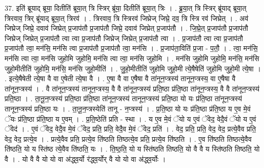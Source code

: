 \documentclass[17pt]{extarticle}
\begin{document}
37. इति॑ ब्रूयाद् ब्रूया॒ दितीति॑ ब्रूया॒त् त्रि स्त्रिर् ब्रू॑या॒ दितीति॑ ब्रूया॒त् त्रिः । . ब्रू॒या॒त् त्रि स्त्रिर् ब्रू॑याद् ब्रूया॒त् त्रिरवाव॒ त्रिर् ब्रू॑याद् ब्रूया॒त् त्रिरव॑ । . त्रिरवाव॒ त्रि स्त्रिरव॑ जिघ्रेज् जिघ्रे॒ दव॒ त्रि स्त्रि रव॑ जिघ्रेत् । . अव॑ जिघ्रेज् जिघ्रे॒ दवाव॑ जिघ्रेत् प्र॒जाप॑तौ प्र॒जाप॑तौ जिघ्रे॒ दवाव॑ जिघ्रेत् प्र॒जाप॑तौ । . जि॒घ्रे॒त् प्र॒जाप॑तौ प्र॒जाप॑तौ जिघ्रेज् जिघ्रेत् प्र॒जाप॑तौ त्वा त्वा प्र॒जाप॑तौ जिघ्रेज् जिघ्रेत् प्र॒जाप॑तौ त्वा । . प्र॒जाप॑तौ त्वा त्वा प्र॒जाप॑तौ प्र॒जाप॑तौ त्वा॒ मन॑सि॒ मन॑सि त्वा प्र॒जाप॑तौ प्र॒जाप॑तौ त्वा॒ मन॑सि । . प्र॒जाप॑ता॒विति॑ प्र॒जा - प॒तौ॒ । . त्वा॒ मन॑सि॒ मन॑सि त्वा त्वा॒ मन॑सि जुहोमि जुहोमि॒ मन॑सि त्वा त्वा॒ मन॑सि जुहोमि । . मन॑सि जुहोमि जुहोमि॒ मन॑सि॒ मन॑सि जुहो॒मीतीति॑ जुहोमि॒ मन॑सि॒ मन॑सि जुहो॒मीति॑ । . जु॒हो॒मीतीति॑ जुहोमि जुहो॒मी त्ये॒षैषेति॑ जुहोमि जुहो॒मी त्ये॒षा । . इत्ये॒षैषेती त्ये॒षा वै वा ए॒षेती त्ये॒षा वै । . ए॒षा वै वा ए॒षैषा वै ता॑नून॒प्त्रस्य॑ तानून॒प्त्रस्य॒ वा ए॒षैषा वै ता॑नून॒प्त्रस्य॑ । . वै ता॑नून॒प्त्रस्य॑ तानून॒प्त्रस्य॒ वै वै ता॑नून॒प्त्रस्य॑ प्रति॒ष्ठा प्र॑ति॒ष्ठा ता॑नून॒प्त्रस्य॒ वै वै ता॑नून॒प्त्रस्य॑ प्रति॒ष्ठा । . ता॒नू॒न॒प्त्रस्य॑ प्रति॒ष्ठा प्र॑ति॒ष्ठा ता॑नून॒प्त्रस्य॑ तानून॒प्त्रस्य॑ प्रति॒ष्ठा यो यः प्र॑ति॒ष्ठा ता॑नून॒प्त्रस्य॑ तानून॒प्त्रस्य॑ प्रति॒ष्ठा यः । . ता॒नू॒न॒प्त्रस्येति॑ तानू - न॒प्त्रस्य॑ । . प्र॒ति॒ष्ठा यो यः प्र॑ति॒ष्ठा प्र॑ति॒ष्ठा य ए॒व मे॒वं ॅयः प्र॑ति॒ष्ठा प्र॑ति॒ष्ठा य ए॒वम् । . प्र॒ति॒ष्ठेति॑ प्रति - स्था । . य ए॒व मे॒वं ॅयो य ए॒वं ॅवेद॒ वेदै॒वं ॅयो य ए॒वं ॅवेद॑ । . ए॒वं ॅवेद॒ वेदै॒व मे॒वं ॅवेद॒ प्रति॒ प्रति॒ वेदै॒व मे॒वं ॅवेद॒ प्रति॑ । . वेद॒ प्रति॒ प्रति॒ वेद॒ वेद॒ प्रत्ये॒वैव प्रति॒ वेद॒ वेद॒ प्रत्ये॒व । . प्रत्ये॒वैव प्रति॒ प्रत्ये॒व ति॑ष्ठति तिष्ठत्ये॒व प्रति॒ प्रत्ये॒व ति॑ष्ठति । . ए॒व ति॑ष्ठति तिष्ठत्ये॒वैव ति॑ष्ठति॒ यो य स्ति॑ष्ठ त्ये॒वैव ति॑ष्ठति॒ यः । . ति॒ष्ठ॒ति॒ यो य स्ति॑ष्ठति तिष्ठति॒ यो वै वै य स्ति॑ष्ठति तिष्ठति॒ यो वै । . यो वै वै यो यो वा अ॑द्ध्व॒र्यो र॑द्ध्व॒र्योर् वै यो यो वा अ॑द्ध्व॒र्योः । \newline
\pagebreak
{}
\end{document}
